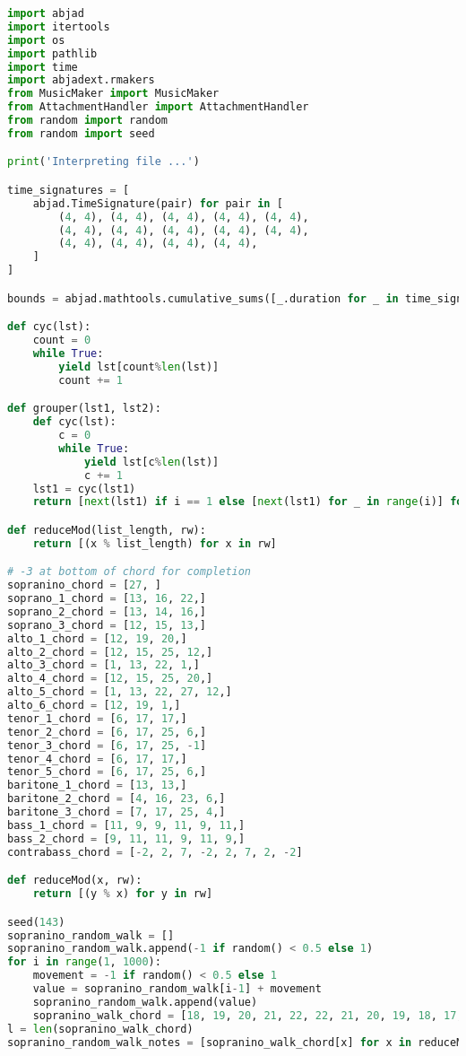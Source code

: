 \begin{lstlisting}[language=Python, caption=Invocation Source Code]
import abjad
import itertools
import os
import pathlib
import time
import abjadext.rmakers
from MusicMaker import MusicMaker
from AttachmentHandler import AttachmentHandler
from random import random
from random import seed

print('Interpreting file ...')

time_signatures = [
    abjad.TimeSignature(pair) for pair in [
        (4, 4), (4, 4), (4, 4), (4, 4), (4, 4),
        (4, 4), (4, 4), (4, 4), (4, 4), (4, 4),
        (4, 4), (4, 4), (4, 4), (4, 4),
    ]
]

bounds = abjad.mathtools.cumulative_sums([_.duration for _ in time_signatures])

def cyc(lst):
    count = 0
    while True:
        yield lst[count%len(lst)]
        count += 1

def grouper(lst1, lst2):
    def cyc(lst):
        c = 0
        while True:
            yield lst[c%len(lst)]
            c += 1
    lst1 = cyc(lst1)
    return [next(lst1) if i == 1 else [next(lst1) for _ in range(i)] for i in lst2]

def reduceMod(list_length, rw):
    return [(x % list_length) for x in rw]

# -3 at bottom of chord for completion
sopranino_chord = [27, ]
soprano_1_chord = [13, 16, 22,]
soprano_2_chord = [13, 14, 16,]
soprano_3_chord = [12, 15, 13,]
alto_1_chord = [12, 19, 20,]
alto_2_chord = [12, 15, 25, 12,]
alto_3_chord = [1, 13, 22, 1,]
alto_4_chord = [12, 15, 25, 20,]
alto_5_chord = [1, 13, 22, 27, 12,]
alto_6_chord = [12, 19, 1,]
tenor_1_chord = [6, 17, 17,]
tenor_2_chord = [6, 17, 25, 6,]
tenor_3_chord = [6, 17, 25, -1]
tenor_4_chord = [6, 17, 17,]
tenor_5_chord = [6, 17, 25, 6,]
baritone_1_chord = [13, 13,]
baritone_2_chord = [4, 16, 23, 6,]
baritone_3_chord = [7, 17, 25, 4,]
bass_1_chord = [11, 9, 9, 11, 9, 11,]
bass_2_chord = [9, 11, 11, 9, 11, 9,]
contrabass_chord = [-2, 2, 7, -2, 2, 7, 2, -2]

def reduceMod(x, rw):
    return [(y % x) for y in rw]

seed(143)
sopranino_random_walk = []
sopranino_random_walk.append(-1 if random() < 0.5 else 1)
for i in range(1, 1000):
    movement = -1 if random() < 0.5 else 1
    value = sopranino_random_walk[i-1] + movement
    sopranino_random_walk.append(value)
    sopranino_walk_chord = [18, 19, 20, 21, 22, 22, 21, 20, 19, 18, 17, 16, 15, 14, 13, 12, 11, 10, 9, 8, 7, 6, 5, 4, 3, 2, 1, 0, -1, -2, -1, 0, 1, 2, 3, 4, 5, 6, 7, 8, 9, 10, 11, 12, 13, 14, 15, 16, 17, ]
l = len(sopranino_walk_chord)
sopranino_random_walk_notes = [sopranino_walk_chord[x] for x in reduceMod(l, sopranino_random_walk)]


\end{lstlisting}
